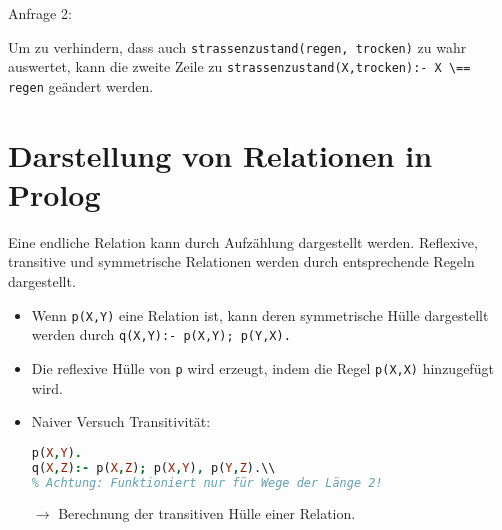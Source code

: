 Anfrage 2:
\begin{center}
\end{center}
Um zu verhindern, dass auch \lstinline$strassenzustand(regen, trocken)$ zu wahr auswertet, kann die zweite Zeile zu \lstinline$strassenzustand(X,trocken):- X \== regen$ geändert werden.

\section{Darstellung von Relationen in Prolog}
Eine endliche Relation kann durch Aufzählung dargestellt werden. Reflexive, transitive und symmetrische Relationen werden durch entsprechende Regeln dargestellt.
\begin{itemize}
\item Wenn \lstinline$p(X,Y)$ eine Relation ist, kann deren symmetrische Hülle dargestellt werden durch \lstinline$q(X,Y):- p(X,Y); p(Y,X).$
\item Die reflexive Hülle von \lstinline$p$ wird erzeugt, indem die Regel \lstinline$p(X,X)$ hinzugefügt wird.
\item Naiver Versuch Transitivität:
\begin{lstlisting}[language=Prolog]
p(X,Y).
q(X,Z):- p(X,Z); p(X,Y), p(Y,Z).\\
% Achtung: Funktioniert nur für Wege der Länge 2!
\end{lstlisting}
$\to$ Berechnung der transitiven Hülle einer Relation.
\end{itemize}

